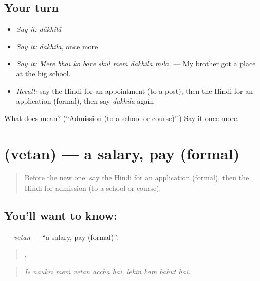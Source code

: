 \subsection*{Your turn}
\begin{itemize}
\raggedright
  \item \emph{Say it:} \emph{dākhilā}
  \item \emph{Say it:} \emph{dākhilā}, once more
  \item \emph{Say it:} \emph{Mere bhāī ko baṛe skūl meṁ dākhilā milā.} — My brother got a place at the big school.
  \item \emph{Recall:} say the Hindi for an appointment (to a post), then the Hindi for an application (formal), then say \emph{dākhilā} again
\end{itemize}

\begin{tcolorbox}[breakable,colback=teal!4,colframe=teal!35!black,title={Before you move on}]
What does  mean? (\textquotedblleft{}Admission (to a school or course)\textquotedblright{}.) Say it once more.
\end{tcolorbox}
\section[\texorpdfstring{\hi{वेतन} (vetan)}{वेतन (vetan)}]{ (vetan) — a salary, pay (formal)}

\label{lesson:HI-C508-vetan}



\begin{quote}
Before the new one: say the Hindi for an application (formal), then the Hindi for admission (to a school or course).
\end{quote}

\subsection*{You'll want to know: }
\textbf{} — \emph{vetan} — \textquotedblleft{}a salary, pay (formal)\textquotedblright{}.

\begin{quote}
     ,    
\end{quote}

\begin{quote}
\emph{Is naukrī meṁ vetan acchā hai, lekin kām bahut hai.}
\end{quote}

